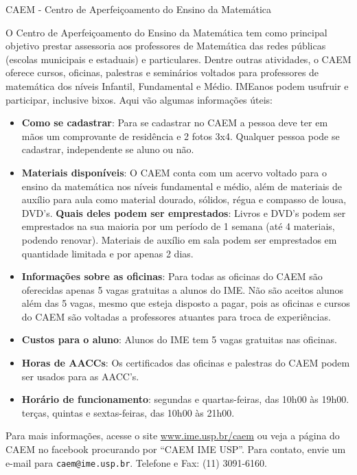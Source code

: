 \begin{secao}{CAEM - Centro de Aperfeiçoamento do Ensino da Matemática}

O Centro de Aperfeiçoamento do Ensino da Matemática tem como principal
objetivo prestar assessoria aos professores de Matemática das redes
públicas (escolas municipais e estaduais) e particulares. Dentre
outras atividades, o CAEM oferece cursos, oficinas, palestras e
seminários voltados para professores de matemática dos níveis
Infantil, Fundamental e Médio. IMEanos podem usufruir e participar,
inclusive bixos. Aqui vão algumas informações úteis:


\begin{itemize}

\item \textbf{Como se cadastrar}: Para se cadastrar no CAEM a pessoa
  deve ter em mãos um comprovante de residência e 2 fotos
  3x4. Qualquer pessoa pode se cadastrar, independente se aluno ou
  não.

\item \textbf{Materiais disponíveis}: O CAEM conta com um acervo
  voltado para o ensino da matemática nos níveis fundamental e médio,
  além de materiais de auxílio para aula como material dourado,
  sólidos, régua e compasso de lousa, DVD's. \textbf{Quais deles podem
    ser emprestados}: Livros e DVD's podem ser emprestados na sua
  maioria por um período de 1 semana (até 4 materiais, podendo
  renovar). Materiais de auxílio em sala podem ser emprestados em
  quantidade limitada e por apenas 2 dias.

\item \textbf{Informações sobre as oficinas}: Para todas as oficinas
  do CAEM são oferecidas apenas 5 vagas gratuitas a alunos do IME. Não
  são aceitos alunos além das 5 vagas, mesmo que esteja disposto a
  pagar, pois as oficinas e cursos do CAEM são voltadas a professores
  atuantes para troca de experiências.

\item \textbf{Custos para o aluno}: Alunos do IME tem 5 vagas
  gratuitas nas oficinas.

\item \textbf{Horas de AACCs}: Os certificados das oficinas e palestras
 do CAEM podem ser usados para as AACC's.

\item \textbf{Horário de funcionamento}: segundas e quartas-feiras,
  das 10h00 às 19h00. terças, quintas e sextas-feiras, das 10h00 às
  21h00.
\end{itemize}

Para mais informações, acesse o site \url{www.ime.usp.br/caem} ou veja
a página do CAEM no facebook procurando por ``CAEM IME USP''. Para
contato, envie um e-mail para {\tt caem@ime.usp.br}. Telefone e Fax:
(11) 3091-6160.


\end{secao}
